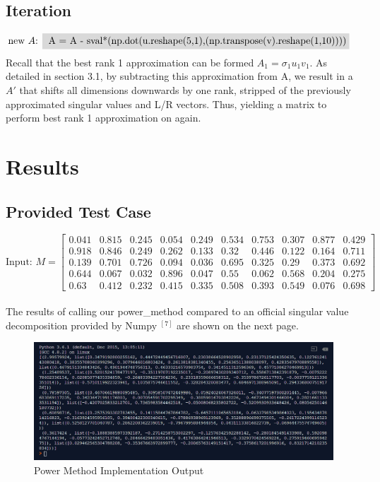 \documentclass[12pt]{article}
\begin{document}
\vspace{-8pt}
\subsection{Iteration}
\vspace{-8pt}
\begin{align*}
    \mbox{new $A$:  } & \colorbox{gray!30}{\textnormal{ A = A - sval*(np.dot(u.reshape(5,1),(np.transpose(v).reshape(1,10))))}}
\end{align*}
Recall that the best rank 1 approximation can be formed $A_1 = \sigma_1 u_1 v_1$. As detailed in section 3.1, by subtracting this approximation from A, we result in a $A'$ that shifts all dimensions downwards by one rank, stripped of the previously approximated singular values and L/R vectors. Thus, yielding a matrix to perform best rank 1 approximation on again. 

\section{Results}
\subsection{Provided Test Case}
\vspace{+15pt}
\[
\text{Input: } M=
  \begin{bmatrix}
    0.041 & 0.815 & 0.245 & 0.054 & 0.249 & 0.534 & 0.753 & 0.307 & 0.877 & 0.429 \\
    0.918 & 0.846 & 0.249 & 0.262 & 0.133 & 0.32 & 0.446 & 0.122 & 0.164 & 0.711 \\
    0.139 &  0.701 &  0.726 & 0.094 & 0.036 & 0.695 & 0.325 & 0.29 & 0.373 & 0.692 \\
    0.644 &  0.067 &  0.032 &  0.896 &  0.047 & 0.55 & 0.062 & 0.568 & 0.204 & 0.275 \\
    0.63 & 0.412 & 0.232 & 0.415 & 0.335 & 0.508 & 0.393 & 0.549 & 0.076 & 0.698
    
  \end{bmatrix}
\]
\vspace{+15pt}\\
The results of calling our power\_method compared to an official singular value decomposition provided by Numpy $^{[7]}$ are shown on the next page.

\begin{figure}[h!]
    \caption{Power Method Implementation Output}
    \centering
    \includegraphics[scale=0.65]{pm1}
\end{figure}
\end{document}
